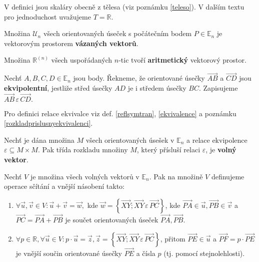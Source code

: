 \begin{pozn}
    V definici jsou skaláry obecně z tělesa (viz poznámku \ref{teleso}). V dalším textu
    pro jednoduchost uvažujeme $T=\mathbb R$.
\end{pozn}

\begin{pozn}
    Množina $\mathscr U_n$ všech orientovaných úseček s počátečním bodem $P\in \mathbb E_n$
    je vektorovým prostorem
    \textbf{vázaných vektorů}.
\end{pozn}

\begin{pozn}
    Množina $\mathbb R^{(n)}$ všech uspořádaných $n$-tic tvoří \textbf{aritmetický}
    vektorový prostor.
\end{pozn}

\begin{definition}
    Nechť $A,B,C,D \in \mathbb E_n$ jsou body. Řekneme, že orientované úsečky
    $\overrightarrow{AB}$ a $\overrightarrow{CD}$ jsou \textbf{ekvipolentní}, jestliže
    střed úsečky $AD$ je i středem úsečky $BC$. Zapisujeme $\overrightarrow{AB}\,\varepsilon\,\overrightarrow{CD}.$
\end{definition}

\begin{pozn}
    Pro definici relace ekvivalce viz def. \ref{reflsymtran}, \ref{ekvivalence} a poznámku \ref{rozkladprislusnyekvivalenci}.
\end{pozn}

\begin{definition}
    Nechť je dána množina $M$ všech orientovaných úsešek v $\mathbb E_n$ a
    relace ekvipolence $\varepsilon \subseteq M\times M.$ Pak třída rozkladu množiny
    $M$, který přísluší relaci $\varepsilon$, je \textbf{volný vektor}.
\end{definition}

\begin{definition}
    Nechť $V$ je množina všech volných vektorů v $\mathbb E_n$. Pak na množině $V$ definujeme
    operace sčítání a vnější násobení takto:
    \begin{enumerate}[$i.$]
    \item $\forall \vec u, \vec v \in V: \vec u + \vec v = \vec w,$ kde $\vec w = \left \{ \overrightarrow{XY}; \overrightarrow{XY} \, \varepsilon \, \overrightarrow{PC} \right \} $, kde $\overrightarrow{PA}\in\vec u, \overrightarrow{PB}\in \vec v$ a $\overrightarrow{PC}=\overrightarrow{PA}+\overrightarrow{PB}$ je součet orientovaných úseček $\overrightarrow{PA},\overrightarrow{PB}.$
   	\item $\forall p \in \mathbb R, \forall \vec u \in V: p\cdot \vec u = \vec z, \vec z = \left \{ \overrightarrow{XY}; \overrightarrow{XY} \, \varepsilon \, \overrightarrow{PC} \right \} $, přitom $\overrightarrow{PE}\in \vec u$ a $\overrightarrow{PF} = p\cdot \overrightarrow{PE}$ je vnější součin orientované úsečky $\overrightarrow{PE}$ a čísla $p$ (tj. pomocí stejnolehlosti).
    \end{enumerate}
\end{definition}

